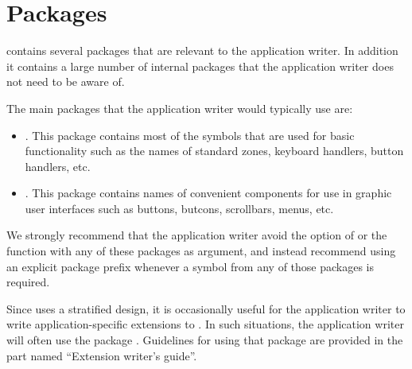 \chapter{Packages}

\clim{} contains several packages that are relevant to the application
writer.  In addition it contains a large number of internal packages
that the application writer does not need to be aware of.

The main packages that the application writer would typically use are:

\begin{itemize}
\item {}.  This package contains most of the symbols that
  are used for basic functionality such as the names of standard
  zones, keyboard handlers, button handlers, etc. 
\item {}.  This package contains names of convenient
  components for use in graphic user interfaces such as buttons,
  butcons, scrollbars, menus, etc.
\end{itemize}

We strongly recommend that the application writer avoid the option
 of  or the function 
with any of these packages as argument, and instead recommend using
an explicit package prefix whenever a symbol from any of those
packages is required.

Since \clim{} uses a stratified design, it is occasionally useful for
the application writer to write application-specific extensions to
\clim{}.  In such situations, the application writer will often use
the package .  Guidelines for using that package are
provided in the part named ``Extension writer's guide''. 

